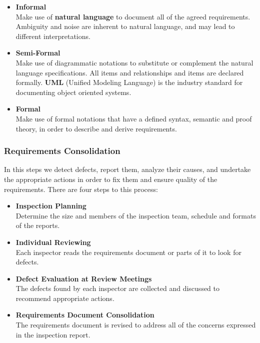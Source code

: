 \documentclass{article}
\begin{document}
\begin{itemize}
	\item \textbf{Informal}
	\vspace{.2cm} \\
	Make use of \textbf{natural language} to document all of the agreed requirements. Ambiguity and noise are inherent to natural language, and may lead to different interpretations.
	
	\item \textbf{Semi-Formal}
	\vspace{.2cm} \\
	Make use of diagrammatic notations to substitute or complement the natural language specifications. All items and relationships and items are declared formally. \textbf{UML} (Unified Modeling Language) is the industry standard for documenting object oriented systems.
	
	\item \textbf{Formal}
	\vspace{.2cm} \\
	Make use of formal notations that have a defined syntax, semantic and proof theory, in order to describe and derive requirements.
\end{itemize}

\subsubsection{Requirements Consolidation}
In this steps we detect defects, report them, analyze their causes, and undertake the appropriate actions in order to fix them and ensure quality of the requirements. There are four steps to this process:

\begin{itemize}
	\item \textbf{Inspection Planning}
	\vspace{.2cm} \\
	Determine the size and members of the inspection team, schedule and formats of the reports.
	
	\item \textbf{Individual Reviewing}
	\vspace{.2cm} \\
	Each inspector reads the requirements document or parts of it to look for defects.
	
	\item \textbf{Defect Evaluation at Review Meetings}
	\vspace{.2cm} \\
	The defects found by each inspector are collected and discussed  to recommend appropriate actions.
	
	\item \textbf{Requirements Document Consolidation}
	\vspace{.2cm} \\
	The requirements document is revised to address all of the concerns expressed in the inspection report.
\end{itemize}
\end{document}
